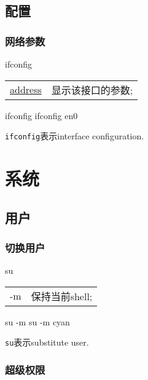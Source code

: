\documentclass[hidelinks]{ctexart}
\begin{document}
\subsection{配置} %
\label{sub:配置}

\subsubsection{网络参数} %
\label{ssub:网络参数}

\begin{shcommand}{ifconfig}
\ttfamily
\begin{tabular}{@{$\bullet\quad$}ll}
    \underline{address}     & 显示该接口的参数; \\
\end{tabular} 
\end{shcommand}
\begin{shlst}
ifconfig
ifconfig en0
\end{shlst}
\texttt{ifconfig}表示interface configuration.




\section{系统} %
\label{sec:系统}

\subsection{用户} %
\label{sub:用户}

\subsubsection{切换用户} %
\label{ssub:切换用户}

\begin{shcommand}{su}
\ttfamily
\begin{tabular}{@{$\bullet\quad$}ll}
   -m      & 保持当前shell;
\end{tabular} 
\end{shcommand}
\begin{shlst}
su -m
su -m cyan
\end{shlst}
\texttt{su}表示substitute user.


\subsubsection{超级权限} %
\label{ssub:超级权限}
\end{document}
